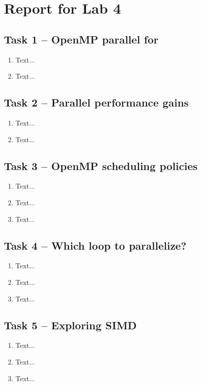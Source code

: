 \documentclass[a4paper, DIV12, headsepline]{scrartcl}
\begin{document}
\section*{Report for Lab 4}
\subsection*{Task 1 -- OpenMP parallel for}
\begin{enumerate}
\item Text...

\item Text...
\end{enumerate}

\subsection*{Task 2 -- Parallel performance gains}
\begin{enumerate}
\item Text...

\item Text...
\end{enumerate}

\subsection*{Task 3 -- OpenMP scheduling policies}
\begin{enumerate}
\item Text...

\item Text...

\item Text...
\end{enumerate}

\subsection*{Task 4 -- Which loop to parallelize?}
\begin{enumerate}
\item Text...

\item Text...

\item Text...
\end{enumerate}

\subsection*{Task 5 -- Exploring SIMD}
\begin{enumerate}
\item Text...

\item Text...

\item Text...
\end{enumerate}
\end{document}
